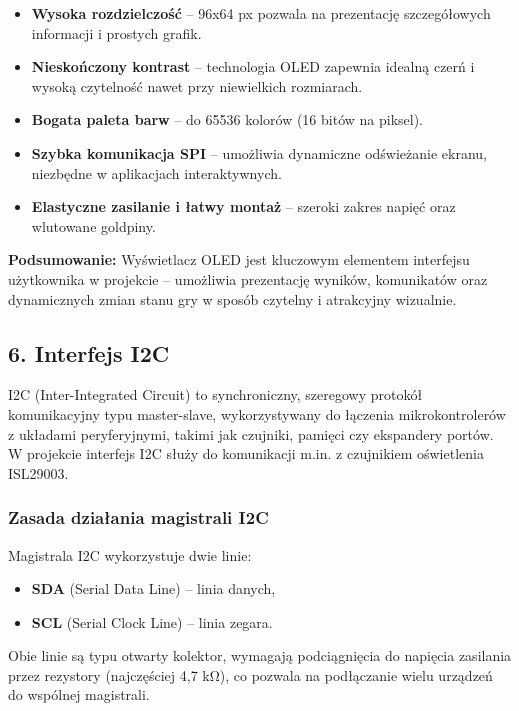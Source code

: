 \documentclass[a4paper,12pt]{report}
\begin{document}
\begin{itemize}
    \item \textbf{Wysoka rozdzielczość} – 96x64 px pozwala na prezentację szczegółowych informacji i prostych grafik.
    \item \textbf{Nieskończony kontrast} – technologia OLED zapewnia idealną czerń i wysoką czytelność nawet przy niewielkich rozmiarach.
    \item \textbf{Bogata paleta barw} – do 65536 kolorów (16 bitów na piksel).
    \item \textbf{Szybka komunikacja SPI} – umożliwia dynamiczne odświeżanie ekranu, niezbędne w aplikacjach interaktywnych.
    \item \textbf{Elastyczne zasilanie i łatwy montaż} – szeroki zakres napięć oraz wlutowane goldpiny.
\end{itemize}

\textbf{Podsumowanie:} Wyświetlacz OLED jest kluczowym elementem interfejsu użytkownika w projekcie – umożliwia prezentację wyników, komunikatów oraz dynamicznych zmian stanu gry w sposób czytelny i atrakcyjny wizualnie.

\subsection*{6. Interfejs I2C}

I2C (Inter-Integrated Circuit) to synchroniczny, szeregowy protokół komunikacyjny typu master-slave, wykorzystywany do łączenia mikrokontrolerów z układami peryferyjnymi, takimi jak czujniki, pamięci czy ekspandery portów. W projekcie interfejs I2C służy do komunikacji m.in. z czujnikiem oświetlenia ISL29003.

\subsubsection*{Zasada działania magistrali I2C}

Magistrala I2C wykorzystuje dwie linie:
\begin{itemize}
    \item \textbf{SDA} (Serial Data Line) – linia danych,
    \item \textbf{SCL} (Serial Clock Line) – linia zegara.
\end{itemize}
Obie linie są typu otwarty kolektor, wymagają podciągnięcia do napięcia zasilania przez rezystory (najczęściej 4,7 k\si{\ohm}), co pozwala na podłączanie wielu urządzeń do wspólnej magistrali.
\end{document}
